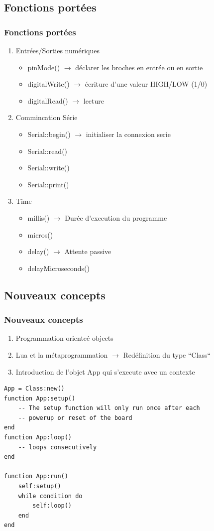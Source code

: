 \documentclass{beamer}
\begin{document}
\subsection{Fonctions portées}
\begin{frame}
\frametitle{Fonctions portées}
\begin{enumerate}
 \item Entrées/Sorties numériques
\begin{itemize}
\item pinMode() $\to$ déclarer les broches en entrée ou en sortie
\item digitalWrite() $\to$ écriture d'une valeur HIGH/LOW (1/0)
\item digitalRead() $\to$ lecture 
\end{itemize}
\item Commincation Série
\begin{itemize}
\item Serial::begin() $\to$ initialiser la connexion serie
\item Serial::read()
\item Serial::write()
\item Serial::print()
\end{itemize}
\item Time
\begin{itemize}
\item millis()  $\to$ Durée d'execution du programme
\item micros() 
\item delay()  $\to$ Attente passive
\item delayMicroseconds()
\end{itemize}
\end{enumerate}
\end{frame}

\subsection{Nouveaux concepts}
\begin{frame}[containsverbatim]
\frametitle{Nouveaux concepts}
\begin{enumerate}
 \item Programmation orienteé objects
 \item Lua et la métaprogrammation $\to$ Redéfinition du type ``Class``
 \item Introduction de l'objet App qui s'execute avec un contexte
\end{enumerate}

\scriptsize{\begin{lstlisting}
App = Class:new()
function App:setup()
    -- The setup function will only run once after each
    -- powerup or reset of the board
end
function App:loop()
    -- loops consecutively
end

function App:run()
    self:setup()
    while condition do
        self:loop()
    end
end
\end{lstlisting}}

\end{frame}
\end{document}
